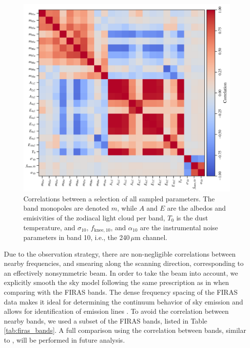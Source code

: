 \documentclass{aa}
\begin{document}
\begin{figure}
    \centering
    \includegraphics[width=1\textwidth]{figs/covmatrix.pdf}
	\caption{Correlations between a selection of all sampled parameters. The band monopoles are denoted $m$, while $A$ and $E$ are the albedos and emisivities of the zodiacal light cloud per band, $T_0$ is the dust temperature, and $\sigma_{10}$, $f_{\mathrm{knee}, 10}$, and $\alpha_{10}$ are the instrumental noise parameters in band 10, i.e., the 240\,$\mu$m channel.}
    \label{fig:correlations}
\end{figure}


Due to the observation strategy, there are non-negligible correlations between nearby frequencies, and smearing along the scanning direction, corresponding to an effectively nonsymmetric beam. In order to take the beam into account, we explicitly smooth the sky model following the same prescription as in \citet{odegard:2019} when comparing with the FIRAS bands. 
The dense frequency spacing of the FIRAS data makes it ideal for determining the continuum behavior of sky emission and allows for identification of emission lines \citep{bennett:1994}. 
To avoid the correlation between nearby bands, we used a subset of the FIRAS bands, listed in Table \ref{tab:firas_bands}. A full comparison using the correlation between bands, similar to \citet{bianchini:2022}, will be performed in future analysis.


\end{document}
